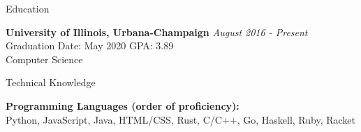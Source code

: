\documentclass{resume} %
\begin{document}

    \begin{rSection}{Education}

{\bf University of Illinois, Urbana-Champaign} \hfill {\em August 2016 - Present} 
\\ Graduation Date: May 2020 \hfill { GPA: 3.89}
\\ Computer Science


        \end{rSection}

        \begin{rSection}{Technical Knowledge}

            \textbf{Programming Languages (order of proficiency):}\\  Python, JavaScript, Java, HTML/CSS, Rust, C/C++, Go, Haskell, Ruby, Racket

            \end{rSection}

\end{document}
